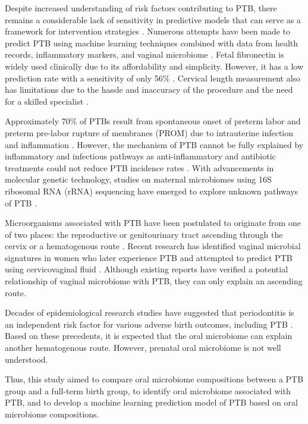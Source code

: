 \documentclass[11pt, a4paper, onecolumn, oneside]{report}
\begin{document}
            Despite increased understanding of risk factors contributing to PTB, there remains a considerable lack of sensitivity in predictive models that can serve as a framework for intervention strategies \cite{PTB-prediction-1}. Numerous attempts have been made to predict PTB using machine learning techniques combined with data from health records, inflammatory markers, and vaginal microbiome \cite{PTB-prediction-2}. Fetal fibronectin is widely used clinically due to its affordability and simplicity. However, it has a low prediction rate with a sensitivity of only 56\% \cite{PTB-prediction-3}. Cervical length measurement also has limitations due to the hassle and inaccuracy of the procedure and the need for a skilled specialist \cite{PTB-prediction-4}.

            Approximately 70\% of PTBs result from spontaneous onset of preterm labor and preterm pre-labor rupture of membranes (PROM) due to intrauterine infection and inflammation \cite{PTB-prediction-5}. However, the mechanism of PTB cannot be fully explained by inflammatory and infectious pathways as anti-inflammatory and antibiotic treatments could not reduce PTB incidence rates \cite{PTB-mechanism-1}. With advancements in molecular genetic technology, studies on maternal microbiomes using 16S ribosomal RNA (rRNA) sequencing have emerged to explore unknown pathways of PTB \cite{PTB-mechanism-2}.

            Microorganisms associated with PTB have been postulated to originate from one of two places: the reproductive or genitourinary tract ascending through the cervix or a hematogenous route \cite{PTB-mechanism-3}. Recent research has identified vaginal microbial signatures in women who later experience PTB and attempted to predict PTB using cervicovaginal fluid \cite{PTB-mechanism-4}. Although existing reports have verified a potential relationship of vaginal microbiome with PTB, they can only explain an ascending route.

            Decades of epidemiological research studies have suggested that periodontitis is an independent risk factor for various adverse birth outcomes, including PTB \cite{PTB-mechanism-5}. Based on these precedents, it is expected that the oral microbiome can explain another hematogenous route. However, prenatal oral microbiome is not well understood.

            Thus, this study aimed to compare oral microbiome compositions between a PTB group and a full-term birth group, to identify oral microbiome associated with PTB, and to develop a machine learning prediction model of PTB based on oral microbiome compositions.
        \newpage
\end{document}
